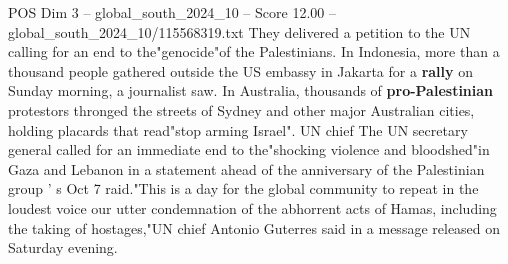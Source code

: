 \begin{textsample}{POS Dim 3 – global\_south\_2024\_10 – Score 12.00 – global\_south\_2024\_10/115568319.txt}
They delivered a petition to the UN calling for an end to the"genocide"of the Palestinians.
In Indonesia, more than a thousand people gathered outside the US embassy in Jakarta for a \textbf{rally} on Sunday morning, a journalist saw.
In Australia, thousands of \textbf{pro-Palestinian} protestors thronged the streets of Sydney and other major Australian cities, holding placards that read"stop arming Israel".
UN chief The UN secretary general called for an immediate end to the"shocking violence and bloodshed"in Gaza and Lebanon in a statement ahead of the anniversary of the Palestinian group ' s Oct 7 raid."This is a day for the global community to repeat in the loudest voice our utter condemnation of the abhorrent acts of Hamas, including the taking of hostages,"UN chief Antonio Guterres said in a message released on Saturday evening.

\end{textsample}
